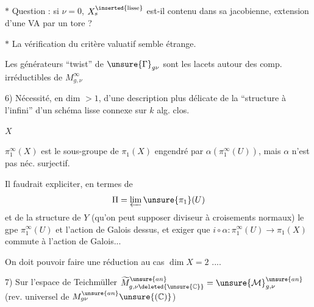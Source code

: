 $*$ Question : si $\nu=0$, $X_s^{\inserted{\text{lisse}}}$ est-il contenu dans sa jacobienne,  extension d'une VA par un tore ?

$*$ La vérification du critère valuatif semble étrange.

Les générateurs ``twist'' de $\unsure{\Gamma}_{g\nu}$ sont les lacets autour des comp. irréductibles de $M_{g,\nu}^{\infty}$


6) Nécessité, en dim $>1$, d'une description plus délicate de la ``structure à l'infini'' d'un schéma lisse connexe  sur $k$ alg. clos.

$X$


$\pi_1^\infty(X)$ est le sous-groupe   de $\pi_1(X)$ engendré par $\alpha(\pi_1^\infty(U))$, mais $\alpha$ n'est pas néc. surjectif.

Il faudrait expliciter,  en termes de
\[
\Pi=\varprojlim\unsure{\pi_1}(U)
\]
et de la structure  de $Y$ (qu'on peut supposer diviseur à croisements normaux) le gpe $\pi_1^\infty(U)$ et l'action de Galois dessus, et exiger que  $i\circ\alpha:\pi_1^\infty(U)\longrightarrow\pi_1(X)$ commute à l'action de Galois...

On doit pouvoir  faire une réduction au cas $\dim X=2$ ....

7) Sur l'espace de Teichmüller  $\widetilde M_{g,\nu\deleted{\unsure{\mathbb C}}}^{\unsure{an}}=\unsure{\mathcal M}_{g,\nu}^{\unsure{an}}$ (rev. universel de   $M_{g\nu}^{\unsure{an}}\unsure{(\mathbb C)}$)

